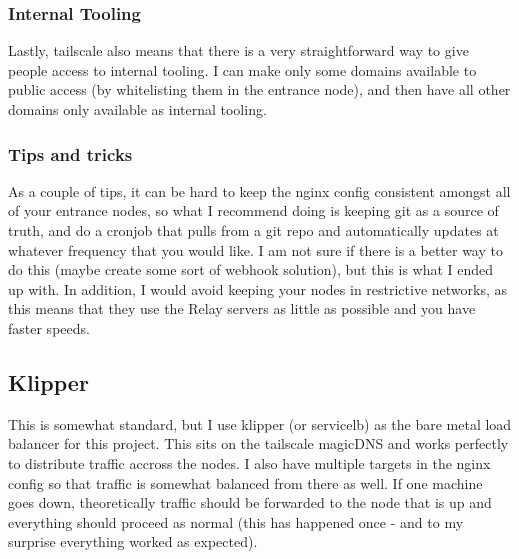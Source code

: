 \documentclass[12pt]{article}
\begin{document}
\subsubsection{Internal Tooling}
Lastly, tailscale also means that there is a very straightforward way to give people access to internal tooling. I can make only some domains available to public access (by whitelisting them in the entrance node), and then have all other domains only available as internal tooling.

\subsubsection{Tips and tricks}
As a couple of tips, it can be hard to keep the nginx config consistent amongst all of your entrance nodes, so what I recommend doing is keeping git as a source of truth, and do a cronjob that pulls from a git repo and automatically updates at whatever frequency that you would like. I am not sure if there is a better way to do this (maybe create some sort of webhook solution), but this is what I ended up with. In addition, I would avoid keeping your nodes in restrictive networks, as this means that they use the Relay servers as little as possible and you have faster speeds.

\subsection{Klipper}
This is somewhat standard, but I use klipper (or servicelb) as the bare metal load balancer for this project. This sits on the tailscale magicDNS and works perfectly to distribute traffic accross the nodes. I also have multiple targets in the nginx config so that traffic is somewhat balanced from there as well. If one machine goes down, theoretically traffic should be forwarded to the node that is up and everything should proceed as normal (this has happened once - and to my surprise everything worked as expected).
\end{document}
